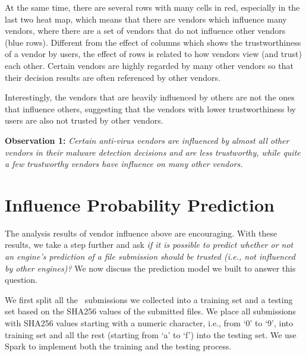 At the same time, there are several rows with many cells in red, especially in the last two heat map, 
which means that there are vendors which influence many vendors,
where there are a set of vendors that do not influence other vendors (blue rows).
Different from the effect of columns which shows the trustworthiness of a vendor by users, 
the effect of rows is related to how vendors view (and trust) each other. 
Certain vendors are highly regarded by many other vendors so that 
their decision results are often referenced by other vendors.

Interestingly, the vendors that are heavily influenced by others are not the ones that influence others, 
suggesting that the vendors with lower trustworthiness by users are also not trusted by other vendors. 




{\bf Observation 1:} 
{\em Certain anti-virus vendors are influenced by almost all other vendors in their malware detection decisions and are less trustworthy, 
while quite a few trustworthy vendors have influence on many other vendors.}

\section{Influence Probability Prediction}
\label{sec:predict}

The analysis results of vendor influence above are encouraging.
With these results, we take a step further and ask 
{\em if it is possible to predict whether or not an engine's prediction of 
a file submission should be trusted (i.e., not influenced by other engines)?}
We now discuss the prediction model we built to answer this question.

We first split all the \pe\ submissions we collected into a training set and a testing set based on 
the SHA256 values of the submitted files. 
We place all submissions with SHA256 values starting with a numeric character, 
i.e., from `0' to `9', into training set
and all the rest (starting from `a' to `f') into the testing set.
We use Spark to implement both the training and the testing process.


